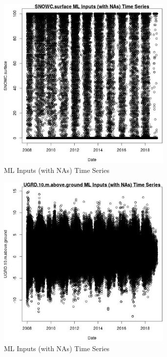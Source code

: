 \begin{figure} 
\centering  
\includegraphics[width=0.77\textwidth]{Code_Outputs/Report_ML_input_PM25_Step4_part_e_de_duplicated_aves_compiled_2019-05-21wNAs_SNOWCsurfacevDate.jpg} 
\caption{\label{fig:Report_ML_input_PM25_Step4_part_e_de_duplicated_aves_compiled_2019-05-21wNAsSNOWCsurfacevDate}ML Inputs (with NAs) Time Series} 
\end{figure} 
 

\clearpage 

\begin{figure} 
\centering  
\includegraphics[width=0.77\textwidth]{Code_Outputs/Report_ML_input_PM25_Step4_part_e_de_duplicated_aves_compiled_2019-05-21wNAs_UGRD10mabovegroundvDate.jpg} 
\caption{\label{fig:Report_ML_input_PM25_Step4_part_e_de_duplicated_aves_compiled_2019-05-21wNAsUGRD10mabovegroundvDate}ML Inputs (with NAs) Time Series} 
\end{figure} 
 

